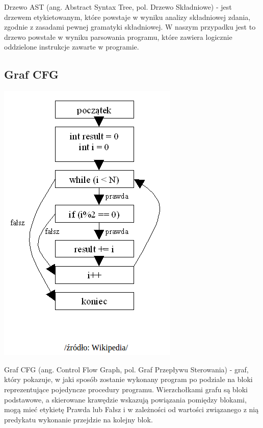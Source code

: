 \documentclass[a4paper,twoside,openright,11pt]{report}
\begin{document}
\par Drzewo AST (ang. Abstract Syntax Tree, pol. Drzewo Składniowe) - jest drzewem etykietowanym, które powstaje w wyniku analizy składniowej zdania, zgodnie z zasadami pewnej gramatyki składniowej. W naszym przypadku jest to drzewo powstałe w wyniku parsowania programu, które zawiera logicznie oddzielone instrukcje zawarte w programie.



  \subsection {Graf CFG}
\begin{center}
  \includegraphics[scale=0.5]{cfg}
\end{center}
  
\par Graf CFG (ang. Control Flow Graph, pol. Graf Przepływu Sterowania) - graf, który pokazuje, w jaki sposób zostanie wykonany program po podziale na bloki reprezentujące pojedyncze procedury programu. Wierzchołkami grafu są bloki podstawowe, a skierowane krawędzie wskazują powiązania pomiędzy blokami, mogą mieć etykietę Prawda lub Fałsz i w zależności od wartości związanego z nią predykatu wykonanie przejdzie na kolejny blok.
\end{document}
